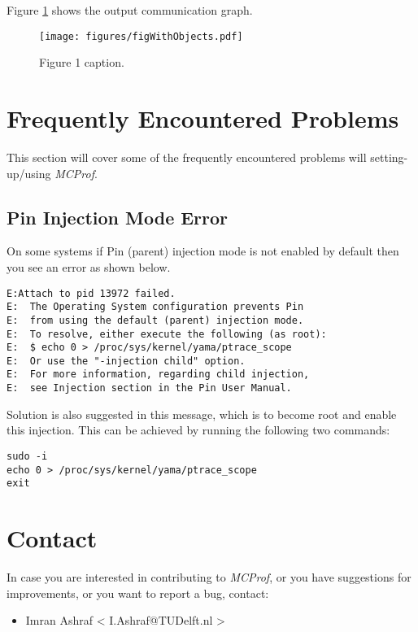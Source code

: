 \documentclass[11pt]{article}
\newcommand{\MCPROF}{\emph{MCProf}}
\begin{document}
Figure \ref{fig:figWithObjects} shows the output communication graph.

\begin{figure}[!bt]
\centering
\texttt{[image: figures/figWithObjects.pdf]}
\caption{Figure 1 caption.}
\label{fig:figWithObjects}
\end{figure}

\section{Frequently Encountered Problems}
\label{sec:faq}

This section will cover some of the frequently encountered problems will setting-up/using
\MCPROF{}.

\subsection{Pin Injection Mode Error}

On some systems if Pin (parent) injection mode is not enabled by default then you see
an error as shown below.

{
\small
\begin{Verbatim}[frame=single]
E:Attach to pid 13972 failed. 
E:  The Operating System configuration prevents Pin
E:  from using the default (parent) injection mode.
E:  To resolve, either execute the following (as root):
E:  $ echo 0 > /proc/sys/kernel/yama/ptrace_scope
E:  Or use the "-injection child" option.
E:  For more information, regarding child injection,
E:  see Injection section in the Pin User Manual.
\end{Verbatim}
}

Solution is also suggested in this message, which is to become root and enable this
injection. This can be achieved by running the following two commands:

{
\small
\begin{Verbatim}[frame=single]
sudo -i
echo 0 > /proc/sys/kernel/yama/ptrace_scope
exit
\end{Verbatim}
}



\section{Contact}
\label{sec:contact}

In case you are interested in contributing to \MCPROF{}, or you have suggestions for
improvements, or you want to report a bug, contact:

\begin{itemize}
\item Imran Ashraf < I.Ashraf@TUDelft.nl >
\end{itemize}




\end{document}
